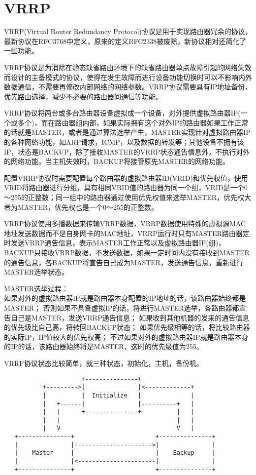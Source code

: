 \section{VRRP}
VRRP(Virtual Router Redundancy Protocol)协议是用于实现路由器冗余的协议，最新协议在RFC3768中定义，原来的定义RFC2338被废除，新协议相对还简化了一些功能。

VRRP协议是为消除在静态缺省路由环境下的缺省路由器单点故障引起的网络失效而设计的主备模式的协议，使得在发生故障而进行设备功能切换时可以不影响内外数据通信，不需要再修改内部网络的网络参数。VRRP协议需要具有IP地址备份，优先路由选择，减少不必要的路由器间通信等功能。

 VRRP协议将两台或多台路由器设备虚拟成一个设备，对外提供虚拟路由器IP(一个或多个)，而在路由器组内部，如果实际拥有这个对外IP的路由器如果工作正常的话就是MASTER，或者是通过算法选举产生，MASTER实现针对虚拟路由器IP的各种网络功能，如ARP请求，ICMP，以及数据的转发等；其他设备不拥有该IP，状态是BACKUP，除了接收MASTER的VRRP状态通告信息外，不执行对外的网络功能。当主机失效时，BACKUP将接管原先MASTER的网络功能。

 配置VRRP协议时需要配置每个路由器的虚拟路由器ID(VRID)和优先权值，使用VRID将路由器进行分组，具有相同VRID值的路由器为同一个组，VRID是一个0～255的正整数；同一组中的路由器通过使用优先权值来选举MASTER，优先权大者为MASTER，优先权也是一个0～255的正整数。

 VRRP协议使用多播数据来传输VRRP数据，VRRP数据使用特殊的虚拟源MAC地址发送数据而不是自身网卡的MAC地址，VRRP运行时只有MASTER路由器定时发送VRRP通告信息，表示MASTER工作正常以及虚拟路由器IP(组)，BACKUP只接收VRRP数据，不发送数据，如果一定时间内没有接收到MASTER的通告信息，各BACKUP将宣告自己成为MASTER，发送通告信息，重新进行MASTER选举状态。

MASTER选举过程：\\
如果对外的虚拟路由器IP就是路由器本身配置的IP地址的话，该路由器始终都是MASTER；
否则如果不具备虚拟IP的话，将进行MASTER选举，各路由器都宣告自己是MASTER，发送VRRP通告信息；
如果收到其他机器的发来的通告信息的优先级比自己高，将转回BACKUP状态；
如果优先级相等的话，将比较路由器的实际IP，IP值较大的优先权高；
不过如果对外的虚拟路由器IP就是路由器本身的IP的话，该路由器始终将是MASTER，这时的优先级值为255。

VRRP协议状态比较简单，就三种状态，初始化，主机，备份机。

\begin{verbatim}
                      +---------------+
           +--------->|               |<-------------+
           |          |  Initialize   |              |
           |   +------|               |----------+   |
           |   |      +---------------+          |   |
           |   |                                 |   |
           |   V                                 V   |
   +---------------+                       +---------------+
   |               |---------------------->|               |
   |    Master     |                       |    Backup     |
   |               |<----------------------|               |
   +---------------+                       +---------------+
\end{verbatim}
   
